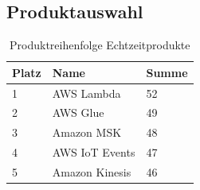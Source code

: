 \subsection{Produktauswahl}

\begin{table}[H]
\centering
\begin{tabular}{|l|l|l|}
\hline
Platz & Name & Summe \\ \hline
1 & AWS Lambda & \cellcolor[HTML]{DAE8FC}52 \\ \hline
2 & AWS Glue & \cellcolor[HTML]{DAE8FC}49 \\ \hline
3 & Amazon MSK & \cellcolor[HTML]{DAE8FC}48 \\ \hline
4 & AWS IoT Events & \cellcolor[HTML]{DAE8FC}47 \\ \hline
5 & Amazon Kinesis & \cellcolor[HTML]{DAE8FC}46 \\ \hline
\end{tabular}
\caption{Produktreihenfolge Echtzeitprodukte}
\label{tab:Reihenfolge-Echtzeit}
\end{table}
